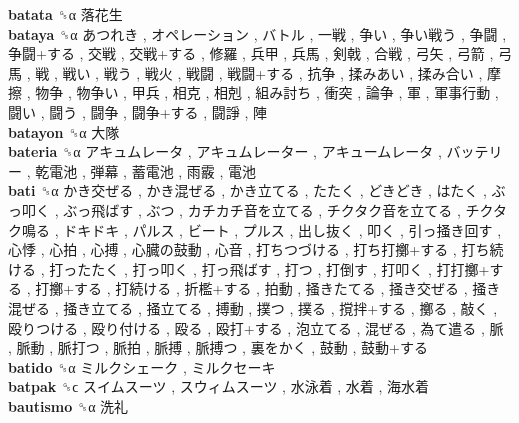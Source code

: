 \textbf{batata} ␝α   落花生   \\
\textbf{bataya} ␝α   あつれき ,  オペレーション ,  バトル ,  一戦 ,  争い ,  争い戦う ,  争闘 ,  争闘+する ,  交戦 ,  交戦+する ,  修羅 ,  兵甲 ,  兵馬 ,  剣戟 ,  合戦 ,  弓矢 ,  弓箭 ,  弓馬 ,  戦 ,  戦い ,  戦う ,  戦火 ,  戦闘 ,  戦闘+する ,  抗争 ,  揉みあい ,  揉み合い ,  摩擦 ,  物争 ,  物争い ,  甲兵 ,  相克 ,  相剋 ,  組み討ち ,  衝突 ,  論争 ,  軍 ,  軍事行動 ,  闘い ,  闘う ,  闘争 ,  闘争+する ,  闘諍 ,  陣   \\
\textbf{batayon} ␝α   大隊   \\
\textbf{bateria} ␝α   アキュムレータ ,  アキュムレーター ,  アキュームレータ ,  バッテリー ,  乾電池 ,  弾幕 ,  蓄電池 ,  雨霰 ,  電池   \\
\textbf{bati} ␝α   かき交ぜる ,  かき混ぜる ,  かき立てる ,  たたく ,  どきどき ,  はたく ,  ぶっ叩く ,  ぶっ飛ばす ,  ぶつ ,  カチカチ音を立てる ,  チクタク音を立てる ,  チクタク鳴る ,  ドキドキ ,  パルス ,  ビート ,  プルス ,  出し抜く ,  叩く ,  引っ掻き回す ,  心悸 ,  心拍 ,  心搏 ,  心臓の鼓動 ,  心音 ,  打ちつづける ,  打ち打擲+する ,  打ち続ける ,  打ったたく ,  打っ叩く ,  打っ飛ばす ,  打つ ,  打倒す ,  打叩く ,  打打擲+する ,  打擲+する ,  打続ける ,  折檻+する ,  拍動 ,  掻きたてる ,  掻き交ぜる ,  掻き混ぜる ,  掻き立てる ,  掻立てる ,  搏動 ,  撲つ ,  撲る ,  撹拌+する ,  擲る ,  敲く ,  殴りつける ,  殴り付ける ,  殴る ,  殴打+する ,  泡立てる ,  混ぜる ,  為て遣る ,  脈 ,  脈動 ,  脈打つ ,  脈拍 ,  脈搏 ,  脈搏つ ,  裏をかく ,  鼓動 ,  鼓動+する   \\
\textbf{batido} ␝α   ミルクシェーク ,  ミルクセーキ   \\
\textbf{batpak} ␝ϲ   スイムスーツ ,  スウィムスーツ ,  水泳着 ,  水着 ,  海水着   \\
\textbf{bautismo} ␝α   洗礼   \\
